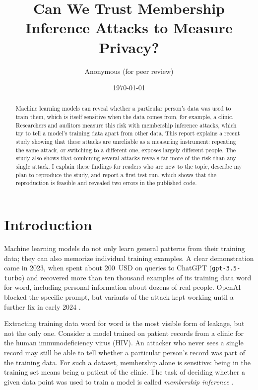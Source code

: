 \documentclass[a4paper]{article}
\author{Anonymous (for peer review)}
\title{Can We Trust Membership Inference Attacks to Measure Privacy?}
\date{\today}
\begin{document}
\maketitle

\begin{abstract}
Machine learning models can reveal whether a particular person's data was used to train them, which is itself sensitive when the data comes from, for example, a clinic.
Researchers and auditors measure this risk with membership inference attacks, which try to tell a model's training data apart from other data.
This report explains a recent study showing that these attacks are unreliable as a measuring instrument: repeating the same attack, or switching to a different one, exposes largely different people.
The study also shows that combining several attacks reveals far more of the risk than any single attack.
I explain these findings for readers who are new to the topic, describe my plan to reproduce the study, and report a first test run, which shows that the reproduction is feasible and revealed two errors in the published code.
\end{abstract}


\section{Introduction}
\label{sec:intro}

Machine learning models do not only learn general patterns from their training data; they can also memorize individual training examples.
A clear demonstration came in 2023, when \citet{nasr2023scalable} spent about 200~USD on queries to ChatGPT (\texttt{gpt-3.5-turbo}) and recovered more than ten thousand examples of its training data word for word, including personal information about dozens of real people.
OpenAI blocked the specific prompt, but variants of the attack kept working until a further fix in early 2024 \citep{breitenbach2024repeated}.

Extracting training data word for word is the most visible form of leakage, but not the only one.
Consider a model trained on patient records from a clinic for the human immunodeficiency virus (HIV).
An attacker who never sees a single record may still be able to tell whether a particular person's record was part of the training data.
For such a dataset, membership alone is sensitive: being in the training set means being a patient of the clinic.
The task of deciding whether a given data point was used to train a model is called \emph{membership inference} \citep{shokri2017membership}.
\end{document}
